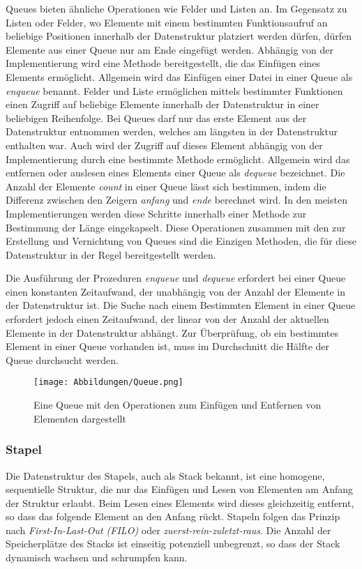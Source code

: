 Queues bieten ähnliche Operationen wie Felder und Listen an. Im Gegensatz zu Listen oder Felder, wo Elemente mit einem bestimmten Funktionsaufruf an beliebige Positionen innerhalb der Datenstruktur platziert werden dürfen, dürfen Elemente aus einer Queue nur am Ende eingefügt werden. Abhängig von der Implementierung wird eine Methode bereitgestellt, die das Einfügen eines Elements ermöglicht. Allgemein wird das Einfügen einer Datei in einer Queue als \textit{enqueue} benannt. Felder und Liste ermöglichen mittels bestimmter Funktionen einen Zugriff auf beliebige Elemente innerhalb der Datenstruktur in einer beliebigen Reihenfolge. Bei Queues darf nur das erste Element aus der Datenstruktur entnommen werden, welches am längsten in der Datenstruktur enthalten war. Auch wird der Zugriff auf dieses Element abhängig von der Implementierung durch eine bestimmte Methode ermöglicht. Allgemein wird das entfernen oder auslesen eines Elements einer Queue als \textit{dequeue} bezeichnet. Die Anzahl der Elemente \textit{count} in einer Queue lässt sich bestimmen, indem die Differenz zwischen den Zeigern \textit{anfang} und \textit{ende} berechnet wird. In den meisten Implementierungen werden diese Schritte innerhalb einer Methode zur Bestimmung der Länge eingekapselt. Diese Operationen zusammen mit den zur Erstellung und Vernichtung von Queues sind die Einzigen Methoden, die für diese Datenstruktur in der Regel bereitgestellt werden. \autocite[71-72]{hubwieser_fundamente_2015} \autocite[371]{gumm_band_2016}

Die Ausführung der Prozeduren \textit{enqueue} und \textit{dequeue} erfordert bei einer Queue einen konstanten Zeitaufwand, der unabhängig von der Anzahl der Elemente in der Datenstruktur ist. Die Suche nach einem Bestimmten Element in einer Queue erfordert jedoch einen Zeitaufwand, der linear von der Anzahl der aktuellen Elemente in der Datenstruktur abhängt. Zur Überprüfung, ob ein bestimmtes Element in einer Queue vorhanden ist, muss im Durchschnitt die Hälfte der Queue durchsucht werden. \autocite[318]{hoffmann_einfuhrung_2011}

\begin{figure}[t]
	\texttt{[image: Abbildungen/Queue.png]}
	\centering
	\caption[Eine Queue]{Eine Queue mit den Operationen zum Einfügen und Entfernen von Elementen dargestellt \autocite[371]{gumm_band_2016}}
	\label{fig: queue}
\end{figure}

\subsubsection{Stapel}
Die Datenstruktur des Stapels, auch als Stack bekannt, ist eine homogene, sequentielle Struktur, die nur das Einfügen und Lesen von Elementen am Anfang der Struktur erlaubt. Beim Lesen eines Elements wird dieses gleichzeitig entfernt, so dass das folgende Element an den Anfang rückt. Stapeln folgen das Prinzip nach \textit{First-In-Last-Out (FILO)} oder \textit{zuerst-rein-zuletzt-raus}. Die Anzahl der Speicherplätze des Stacks ist einseitig potenziell unbegrenzt, so dass der Stack dynamisch wachsen und schrumpfen kann. \autocite[614]{ernst_grundkurs_2020}

